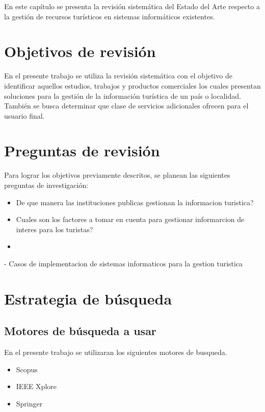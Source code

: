 \documentclass{report}
\begin{document}
En este capítulo se presenta la revisión sistemática del Estado del Arte
respecto a la gestión de recursos turísticos en sistemas informáticos existentes.

\section{Objetivos de revisión}

En el presente trabajo se utiliza la revisión sistemática con el objetivo de
identificar aquellos estudios, trabajos y productos comerciales los cuales presentan
soluciones para la gestión de la información turística de un país o localidad.
También se busca determinar que clase de servicios adicionales ofrecen para el
usuario final.

\section{Preguntas de revisión}

Para lograr los objetivos previamente descritos, se planean las siguientes preguntas
de investigación:

\begin{itemize}
    \item{De que manera las instituciones publicas gestionan la informacion
        turistica?}
    \item{Cuales son los factores a tomar en cuenta para gestionar informarcion
        de interes para los turistas?}
    \item{}
\end{itemize}
- Casos de implementacion de sistemas informaticos para la gestion turistica

\section{Estrategia de búsqueda}

\subsection{Motores de búsqueda a usar}

En el presente trabajo se utilizaran los siguientes motores de busqueda.

\begin{itemize}
    \item{Scopus}
    \item{IEEE Xplore}
    \item{Springer}
\end{itemize}
\end{document}
